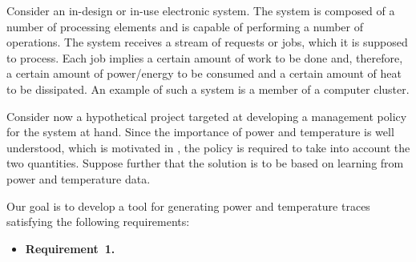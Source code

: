 Consider an in-design or in-use electronic system. The system is composed of a
number of processing elements and is capable of performing a number of
operations. The system receives a stream of requests or jobs, which it is
supposed to process. Each job implies a certain amount of work to be done and,
therefore, a certain amount of power/energy to be consumed and a certain amount
of heat to be dissipated. An example of such a system is a member of a computer
cluster.

Consider now a hypothetical project targeted at developing a management policy
for the system at hand. Since the importance of power and temperature is well
understood, which is motivated in , the policy is required to
take into account the two quantities. Suppose further that the solution is to be
based on learning from power and temperature data.

Our goal is to develop a tool for generating power and temperature traces
satisfying the following requirements:

\begin{itemize}
  \item {\bfseries Requirement~1.}
\end{itemize}
